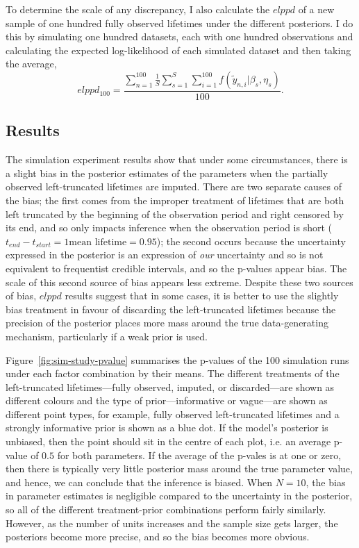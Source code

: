 To determine the scale of any discrepancy, I also calculate the $elppd$ of a new sample of one hundred fully observed lifetimes under the different posteriors. I do this by simulating one hundred datasets, each with one hundred observations and calculating the expected log-likelihood of each simulated dataset and then taking the average,
\begin{equation*}
    \label{eq:elppd-100}
    elppd_{100} = \frac{\sum_{n = 1}^{100}\frac{1}{S}\sum_{s = 1}^{S}\sum_{i = 1}^{100}f(\tilde{y}_{n, i}|\beta_s, \eta_s)}{100}.
\end{equation*}

\subsection{Results}

The simulation experiment results show that under some circumstances, there is a slight bias in the posterior estimates of the parameters when the partially observed left-truncated lifetimes are imputed. There are two separate causes of the bias; the first comes from the improper treatment of lifetimes that are both left truncated by the beginning of the observation period and right censored by its end, and so only impacts inference when the observation period is short ($t_{end} - t_{start} = 1 \text{mean lifetime} = 0.95$); the second occurs because the uncertainty expressed in the posterior is an expression of \textit{our} uncertainty and so is not equivalent to frequentist credible intervals, and so the p-values appear bias. The scale of this second source of bias appears less extreme. Despite these two sources of bias, $elppd$ results suggest that in some cases, it is better to use the slightly bias treatment in favour of discarding the left-truncated lifetimes because the precision of the posterior places more mass around the true data-generating mechanism, particularly if a weak prior is used.

Figure~\ref{fig:sim-study-pvalue} summarises the p-values of the 100 simulation runs under each factor combination by their means. The different treatments of the left-truncated lifetimes---fully observed, imputed, or discarded---are shown as different colours and the type of prior---informative or vague---are shown as different point types, for example, fully observed left-truncated lifetimes and a strongly informative prior is shown as a blue dot. If the model's posterior is unbiased, then the point should sit in the centre of each plot, i.e. an average p-value of $0.5$ for both parameters. If the average of the p-vales is at one or zero, then there is typically very little posterior mass around the true parameter value, and hence, we can conclude that the inference is biased. When $N = 10$, the bias in parameter estimates is negligible compared to the uncertainty in the posterior, so all of the different treatment-prior combinations perform fairly similarly. However, as the number of units increases and the sample size gets larger, the posteriors become more precise, and so the bias becomes more obvious.

